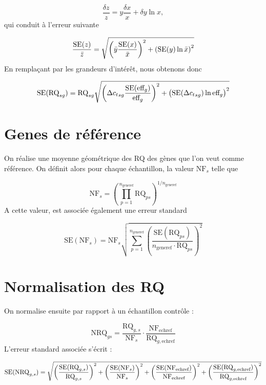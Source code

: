 \documentclass[a4paper,10pt]{article}
\begin{document}
\begin{equation}
 \dfrac{\delta z}{z} = y\dfrac{\delta x}{x}+\delta y \ln x,
\end{equation}
qui conduit à l'erreur suivante

\begin{equation}
 \dfrac{\text{SE}(z)}{\bar{z}} =\sqrt{%
\left(\bar{y}\dfrac{\text{SE}(x)}{\bar{x}}\right)^2+\left(\text{SE}(y) \ln
\bar{x}\right)^2}
\end{equation}
En remplaçant par les grandeurs d'intérêt, nous obtenons donc

\begin{equation}
 \text{SE}(\text{RQ}_{sg}) =\text{RQ}_{sg}\sqrt{%
 \left({\Delta c_t}_{sg}\dfrac{\text{SE}(\text{eff}_g)}{\text{eff}_g}\right)^2+
 \left(\text{SE}({\Delta c_t}_{sg}) \ln \text{eff}_g\right)^2}
\end{equation}

\section{Genes de référence}

On réalise une moyenne géométrique des RQ des gènes que l'on veut comme
référence. On définit alors pour chaque échantillon, la valeur $\text{NF}_{s}$
telle que

\begin{equation}
 \text{NF}_s = \left( \prod_{p=1}^{n_{\text{generef}}} \text{RQ}_{ps}
\right)^{1/n_{\text{generef}}}
\end{equation}
A cette valeur, est associée également une erreur standard

\begin{equation} 
\text{SE}(\text{NF}_s) = \text{NF}_s  \sqrt{\sum_{p=1}^{n_{\text{generef}}}
\left( \dfrac{\text{SE}(\text{RQ}_{ps})}{n_{\text{generef}}\cdot 
\text{RQ}_{ps}} \right)^2}
\end{equation}

\section{Normalisation des RQ}

On normalise ensuite par rapport à un échantillon contrôle :

\begin{equation}
 \text{NRQ}_{gs} =
\dfrac{\text{RQ}_{g,s}}{\text{NF}_s}
\cdot \dfrac{\text{NF}_{\text{echref}}} {\text{RQ}_{g,\text{echref}}}
\end{equation}
L'erreur standard associée s'écrit :

\begin{equation}
 \text{SE}(\text{NRQ}_{g,s}) = \sqrt{%
\left(\dfrac{\text{SE}(\text{RQ}_{g,s})}{\text{RQ}_{g,s}} \right)^2 +
\left(\dfrac{\text{SE}(\text{NF}_{s})}{\text{NF}_{s}} \right)^2 +
\left(\dfrac{\text{SE}(\text{NF}_{\text{echref}})}{\text{NF}_{\text{echref}}}
\right)^2 +
\left(\dfrac{\text{SE}(\text{RQ}_{g,\text{echref}})}{\text{RQ}_{g,\text{echref}}
} \right)^2
}
\end{equation}
\end{document}
